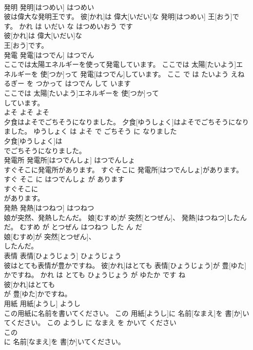 \documentclass[8pt]{extreport}
\begin{document}
\begin{CJK}{UTF8}{min}
\\	発明	発明[はつめい]	はつめい	
\\	彼は偉大な発明王です。	彼[かれ]は 偉大[いだい]な 発明[はつめい] 王[おう]です。	かれ は いだい な はつめいおう です	
\\	彼[かれ]は 偉大[いだい]な
\\	王[おう]です。			
\\	発電	発電[はつでん]	はつでん	
\\	ここでは太陽エネルギーを使って発電しています。	ここでは 太陽[たいよう]エネルギーを 使[つか]って 発電[はつでん]しています。	ここ で は たいよう えねるぎー を つかって はつでん して います	
\\	ここでは 太陽[たいよう]エネルギーを 使[つか]って
\\	しています。			
\\	よそ	よそ	よそ	
\\	夕食はよそでごちそうになりました。	夕食[ゆうしょく]はよそでごちそうになりました。	ゆうしょく は よそ で ごちそう に なりました	
\\	夕食[ゆうしょく]は
\\	でごちそうになりました。			
\\	発電所	発電所[はつでんしょ]	はつでんしょ	
\\	すぐそこに発電所があります。	すぐそこに 発電所[はつでんしょ]があります。	すぐ そこ に はつでんしょ が あります	
\\	すぐそこに
\\	があります。			
\\	発熱	発熱[はつねつ]	はつねつ	
\\	娘が突然、発熱したんだ。	娘[むすめ]が 突然[とつぜん]、 発熱[はつねつ]したんだ。	むすめ が とつぜん はつねつ した ん だ	
\\	娘[むすめ]が 突然[とつぜん]、
\\	したんだ。			
\\	表情	表情[ひょうじょう]	ひょうじょう	
\\	彼はとても表情が豊かですね。	彼[かれ]はとても 表情[ひょうじょう]が 豊[ゆた]かですね。	かれ は とても ひょうじょう が ゆたか です ね	
\\	彼[かれ]はとても
\\	が 豊[ゆた]かですね。			
\\	用紙	用紙[ようし]	ようし	
\\	この用紙に名前を書いてください。	この 用紙[ようし]に 名前[なまえ]を 書[か]いてください。	この ようし に なまえ を かいて ください	
\\	この
\\	に 名前[なまえ]を 書[か]いてください。			

\end{CJK}
\end{document}
